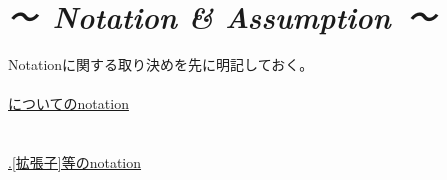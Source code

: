 \documentclass[10pt,a4j,openany,dvipdfmx]{jsarticle}
\begin{document}
\section*{\it {～\ Notation }\rm{\&}\it{ Assumption\ ～}}
Notationに関する取り決めを先に明記しておく。
\\
\\
\underline{についてのnotation}\\
\\
\\
\underline{.[拡張子]等のnotation}\\


\end{document}

